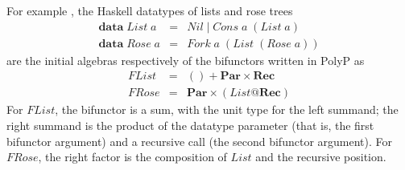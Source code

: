 \documentclass[fleqn,runningheads]{llncs}
\begin{document}
For example \cite{Jeuring&Jansson96:Polytypic}, the Haskell datatypes of lists and rose trees
\[ \begin{array}{lcl}
\mathbf{data} \; \mathit{List}\;a &=& \mathit{Nil} \mid \mathit{Cons}\;a\;(\mathit{List}\;a) \\
\mathbf{data} \; \mathit{Rose}\;a &=& \mathit{Fork}\;a\;(\mathit{List}\;(\mathit{Rose}\;a))
\end{array} \]
are the initial algebras respectively of the bifunctors written in PolyP as
\[ \begin{array}{lcl}
\mathit{FList} &=& () + \mathbf{Par} \times \mathbf{Rec} \\
\mathit{FRose} &=& \mathbf{Par} \times (\mathit{List} \atsign \mathbf{Rec})
\end{array} \]
For $\mathit{FList}$, the bifunctor is a sum, with the unit type for the left summand; the right summand is the product of the datatype parameter (that is, the first bifunctor argument) and a recursive call (the second bifunctor argument). For $\mathit{FRose}$, the right factor is the composition of $\mathit{List}$ and the recursive position.
\end{document}
